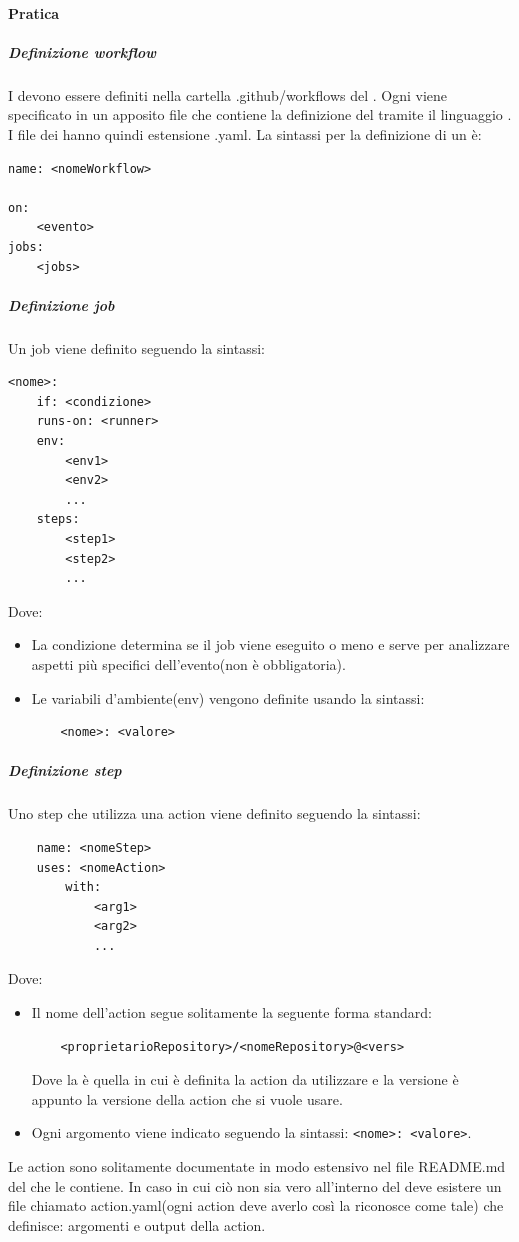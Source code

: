 \paragraph{Pratica}

\subparagraph{Definizione workflow}
I  devono essere definiti nella cartella .github/workflows del .
Ogni  viene specificato in un apposito file che contiene la definizione del  tramite il linguaggio .
I file dei  hanno quindi estensione .yaml.
La sintassi per la definizione di un  è:
\begin{lstlisting}
name: <nomeWorkflow>

on:
    <evento>
jobs:
    <jobs>
\end{lstlisting}

\subparagraph{Definizione job}
Un job viene definito seguendo la sintassi:
\begin{lstlisting}
<nome>:
    if: <condizione>
    runs-on: <runner>
    env:
        <env1>
        <env2>
        ...
    steps:
        <step1>
        <step2>
        ...
\end{lstlisting}
Dove:
\begin{itemize}
    \item La condizione determina se il job viene eseguito o meno e serve per analizzare aspetti più specifici dell'evento(non è obbligatoria).
    
    \item Le variabili d'ambiente(env) vengono definite usando la sintassi:
    \begin{lstlisting}
    <nome>: <valore>
    \end{lstlisting}
\end{itemize}

\subparagraph{Definizione step}
Uno step che utilizza una action viene definito seguendo la sintassi:
\begin{lstlisting}
    name: <nomeStep>
    uses: <nomeAction>
        with:
            <arg1>
            <arg2>
            ...
\end{lstlisting}
Dove:
\begin{itemize}
    \item Il nome dell'action segue solitamente la seguente forma standard: 
    \begin{lstlisting}
    <proprietarioRepository>/<nomeRepository>@<vers>
    \end{lstlisting}
    Dove la  è quella in cui è definita la action da utilizzare e la versione è appunto la versione della action che si vuole usare.
    \item  Ogni argomento viene indicato seguendo la sintassi: \texttt{<nome>: <valore>}.
\end{itemize}
Le action sono solitamente documentate in modo estensivo nel file README.md del  che le contiene.
In caso in cui ciò non sia vero all'interno del  deve esistere un file chiamato action.yaml(ogni action deve averlo così  la riconosce come tale) che definisce: argomenti e output della action.

